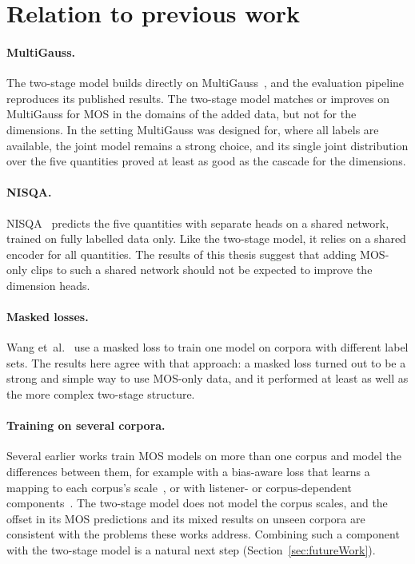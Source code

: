 \documentclass[
english,                 %
bibtex,                  %
includeExtraAbstracts, %
]{kththesis}
\numberwithin{listing}{chapter}
\begin{document}
\section{Relation to previous work}
\label{sec:previousWork}

\paragraph{MultiGauss.} The two-stage model builds directly on MultiGauss~\cite{cumlin_multigauss_2025}, and the evaluation pipeline reproduces its published results. The two-stage model matches or improves on MultiGauss for MOS in the domains of the added data, but not for the dimensions. In the setting MultiGauss was designed for, where all labels are available, the joint model remains a strong choice, and its single joint distribution over the five quantities proved at least as good as the cascade for the dimensions.

\paragraph{NISQA.} NISQA~\cite{mittag_nisqa_2021} predicts the five quantities with separate heads on a shared network, trained on fully labelled data only. Like the two-stage model, it relies on a shared encoder for all quantities. The results of this thesis suggest that adding MOS-only clips to such a shared network should not be expected to improve the dimension heads.

\paragraph{Masked losses.} Wang et~al.~\cite{wang_urgentmos_2026} use a masked loss to train one model on corpora with different label sets. The results here agree with that approach: a masked loss turned out to be a strong and simple way to use MOS-only data, and it performed at least as well as the more complex two-stage structure.

\paragraph{Training on several corpora.} Several earlier works train MOS models on more than one corpus and model the differences between them, for example with a bias-aware loss that learns a mapping to each corpus's scale~\cite{mittag_biasaware_2021}, or with listener- or corpus-dependent components~\cite{leng_mbnet_2021,huang_ldnet_2022}. The two-stage model does not model the corpus scales, and the offset in its MOS predictions and its mixed results on unseen corpora are consistent with the problems these works address. Combining such a component with the two-stage model is a natural next step (Section~\ref{sec:futureWork}).
\end{document}
